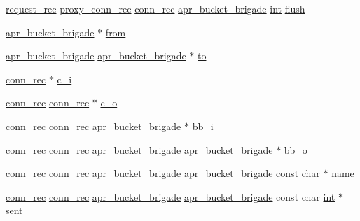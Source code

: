\begin{DoxyCompactItemize}
\item 
\hyperlink{structrequest__rec}{request\+\_\+rec} \hyperlink{structproxy__conn__rec}{proxy\+\_\+conn\+\_\+rec} \hyperlink{structconn__rec}{conn\+\_\+rec} \hyperlink{structapr__bucket__brigade}{apr\+\_\+bucket\+\_\+brigade} \hyperlink{pcre_8txt_a42dfa4ff673c82d8efe7144098fbc198}{int} \hyperlink{group__MOD__PROXY_ga5e2c445a3d8cd8536a753d17dd40f4b6}{flush}
\item 
\hyperlink{structapr__bucket__brigade}{apr\+\_\+bucket\+\_\+brigade} $\ast$ \hyperlink{group__MOD__PROXY_ga900bb06a4314d99c8ad08d1ceffd114e}{from}
\item 
\hyperlink{structapr__bucket__brigade}{apr\+\_\+bucket\+\_\+brigade} \hyperlink{structapr__bucket__brigade}{apr\+\_\+bucket\+\_\+brigade} $\ast$ \hyperlink{group__MOD__PROXY_ga4d80b46c1e04eba6561893714933df30}{to}
\item 
\hyperlink{structconn__rec}{conn\+\_\+rec} $\ast$ \hyperlink{group__MOD__PROXY_gae8b7200fc364117dfbb25c6bf1e3f1b9}{c\+\_\+i}
\item 
\hyperlink{structconn__rec}{conn\+\_\+rec} \hyperlink{structconn__rec}{conn\+\_\+rec} $\ast$ \hyperlink{group__MOD__PROXY_ga93cf2486ee57f9d8ec247c8a8b304202}{c\+\_\+o}
\item 
\hyperlink{structconn__rec}{conn\+\_\+rec} \hyperlink{structconn__rec}{conn\+\_\+rec} \hyperlink{structapr__bucket__brigade}{apr\+\_\+bucket\+\_\+brigade} $\ast$ \hyperlink{group__MOD__PROXY_ga22cd7051b4d61af8a777447d7d65da65}{bb\+\_\+i}
\item 
\hyperlink{structconn__rec}{conn\+\_\+rec} \hyperlink{structconn__rec}{conn\+\_\+rec} \hyperlink{structapr__bucket__brigade}{apr\+\_\+bucket\+\_\+brigade} \hyperlink{structapr__bucket__brigade}{apr\+\_\+bucket\+\_\+brigade} $\ast$ \hyperlink{group__MOD__PROXY_gaaa1c682c0bcc62cfd334ed6e72e8840a}{bb\+\_\+o}
\item 
\hyperlink{structconn__rec}{conn\+\_\+rec} \hyperlink{structconn__rec}{conn\+\_\+rec} \hyperlink{structapr__bucket__brigade}{apr\+\_\+bucket\+\_\+brigade} \hyperlink{structapr__bucket__brigade}{apr\+\_\+bucket\+\_\+brigade} const char $\ast$ \hyperlink{group__MOD__PROXY_ga0a127f08740aaf3e315dcd155ddbf080}{name}
\item 
\hyperlink{structconn__rec}{conn\+\_\+rec} \hyperlink{structconn__rec}{conn\+\_\+rec} \hyperlink{structapr__bucket__brigade}{apr\+\_\+bucket\+\_\+brigade} \hyperlink{structapr__bucket__brigade}{apr\+\_\+bucket\+\_\+brigade} const char \hyperlink{pcre_8txt_a42dfa4ff673c82d8efe7144098fbc198}{int} $\ast$ \hyperlink{group__MOD__PROXY_gac5561b42c6c7f77be9a789f039116fc1}{sent}

\end{DoxyCompactItemize}
